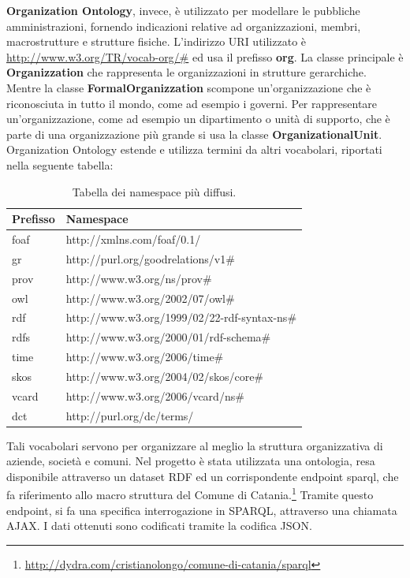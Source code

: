 \documentclass[a4paper,11pt]{article}
\begin{document}
\textbf{Organization Ontology}, invece, è utilizzato per modellare le pubbliche amministrazioni, fornendo indicazioni relative ad organizzazioni, membri, macrostrutture e strutture fisiche.
L'indirizzo URI utilizzato è \url{http://www.w3.org/TR/vocab-org/\#} ed usa il prefisso \textbf{org}.\newline
La classe principale è \textbf{Organizzation} che rappresenta le organizzazioni in strutture gerarchiche.
Mentre la classe \textbf{FormalOrganizzation} scompone un'organizzazione che è riconosciuta in tutto il mondo, come ad esempio i governi.
Per rappresentare un'organizzazione, come ad esempio un dipartimento o unità di supporto, che è parte di una organizzazione più grande si usa la classe \textbf{OrganizationalUnit}.
Organization Ontology estende e utilizza termini da altri vocabolari, riportati nella seguente tabella:
\begin{table}[!htb]
\begin{center}				
\begin{tabular}{|>{\small}l|>{\small}l|}
	\hline \textbf{Prefisso} & \textbf{Namespace}\\				
	\hline foaf & http://xmlns.com/foaf/0.1/\\
	\hline gr & http://purl.org/goodrelations/v1\#\\
	\hline prov & http://www.w3.org/ns/prov\#\\
	\hline owl & http://www.w3.org/2002/07/owl\#\\
	\hline rdf & http://www.w3.org/1999/02/22-rdf-syntax-ns\#\\
	\hline rdfs & http://www.w3.org/2000/01/rdf-schema\#\\			
	\hline time & http://www.w3.org/2006/time\#\\
	\hline skos & http://www.w3.org/2004/02/skos/core\#\\					
	\hline vcard & http://www.w3.org/2006/vcard/ns\#\\											\hline 	dct & http://purl.org/dc/terms/\\			
	\hline
\end{tabular}	
\caption{Tabella dei namespace più diffusi.}	
\end{center}	
\end{table}\newpage
Tali vocabolari servono per organizzare al meglio la struttura organizzativa di aziende, società e comuni.
Nel progetto è stata utilizzata una ontologia, resa disponibile attraverso un dataset RDF ed un corrispondente endpoint sparql, che fa riferimento allo macro struttura del Comune di Catania.\footnote{\url{http://dydra.com/cristianolongo/comune-di-catania/sparql}}\newline
Tramite questo endpoint, si fa una specifica interrogazione in SPARQL, attraverso una chiamata AJAX. I dati ottenuti sono codificati tramite la codifica JSON.
\newpage
\end{document}
